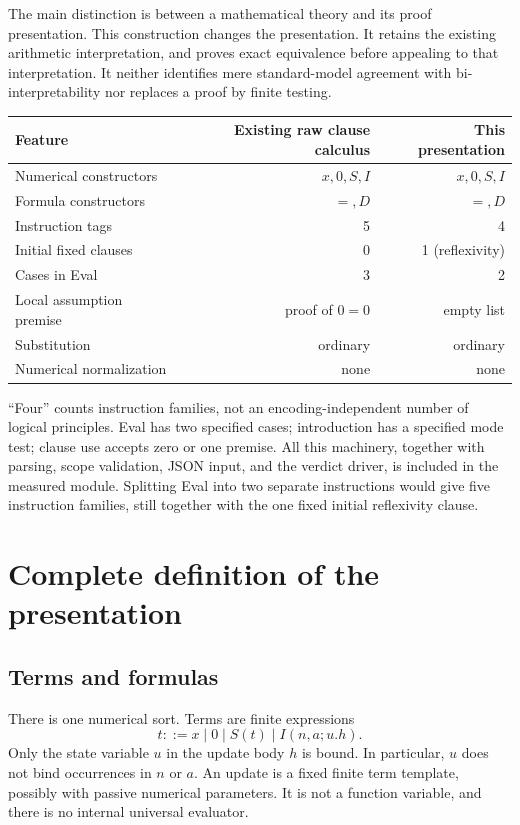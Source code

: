 \documentclass[11pt,letterpaper]{article}
\theoremstyle{definition}\newtheorem{definition}[theorem]{Definition}
\begin{document}
The main distinction is between a mathematical theory and its proof
presentation. This construction changes the presentation. It retains the
existing arithmetic interpretation, and proves exact equivalence before
appealing to that interpretation. It neither identifies mere standard-model
agreement with bi-interpretability nor replaces a proof by finite testing.

\begin{center}
\begin{tabular}{lrr}
\toprule
Feature & Existing raw clause calculus & This presentation\\
\midrule
Numerical constructors & $x,0,S,I$ & $x,0,S,I$\\
Formula constructors & $=,D$ & $=,D$\\
Instruction tags & 5 & 4\\
Initial fixed clauses & 0 & 1 (reflexivity)\\
Cases in Eval & 3 & 2\\
Local assumption premise & proof of $0=0$ & empty list\\
Substitution & ordinary & ordinary\\
Numerical normalization & none & none\\
\bottomrule
\end{tabular}
\end{center}

``Four'' counts instruction families, not an encoding-independent number of
logical principles. Eval has two specified cases; introduction has a
specified mode test; clause use accepts zero or one premise. All this
machinery, together with parsing, scope validation, JSON input, and the
verdict driver, is included in the measured module.
Splitting Eval into two separate instructions would give five instruction
families, still together with the one fixed initial reflexivity clause.

\section{Complete definition of the presentation}
\label{sec:rules}

\subsection{Terms and formulas}

There is one numerical sort. Terms are finite expressions
\[
 t ::= x\mid 0\mid S(t)\mid I(n,a;u.h).
\]
Only the state variable $u$ in the update body $h$ is bound. In particular,
$u$ does not bind occurrences in $n$ or $a$. An update is a fixed finite
term template, possibly with passive numerical parameters. It is not a
function variable, and there is no internal universal evaluator.
\end{document}
